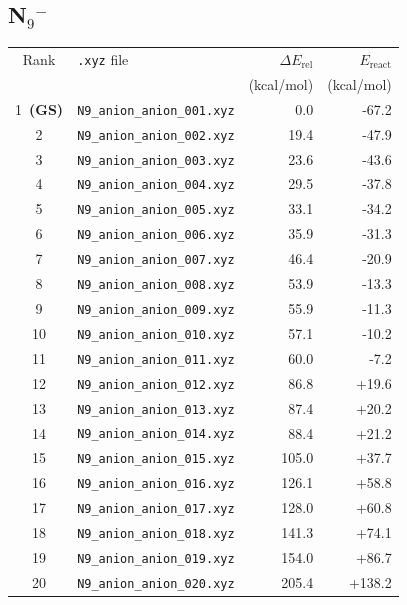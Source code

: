 \documentclass[11pt,a4paper]{article}
\begin{document}
\subsection*{N$_{9}$$^{-}$}
\begin{longtable}{clrr}
\toprule
Rank & \texttt{.xyz} file & $\Delta E_\text{rel}$ & $E_\text{react}$ \\
 & & (kcal/mol) & (kcal/mol) \\
\midrule\endhead
\rowcolor{gs}1~\textbf{(GS)} & \texttt{N9\_anion\_anion\_001.xyz} & 0.0 & -67.2 \\
2 & \texttt{N9\_anion\_anion\_002.xyz} & 19.4 & -47.9 \\
3 & \texttt{N9\_anion\_anion\_003.xyz} & 23.6 & -43.6 \\
4 & \texttt{N9\_anion\_anion\_004.xyz} & 29.5 & -37.8 \\
5 & \texttt{N9\_anion\_anion\_005.xyz} & 33.1 & -34.2 \\
6 & \texttt{N9\_anion\_anion\_006.xyz} & 35.9 & -31.3 \\
7 & \texttt{N9\_anion\_anion\_007.xyz} & 46.4 & -20.9 \\
8 & \texttt{N9\_anion\_anion\_008.xyz} & 53.9 & -13.3 \\
9 & \texttt{N9\_anion\_anion\_009.xyz} & 55.9 & -11.3 \\
10 & \texttt{N9\_anion\_anion\_010.xyz} & 57.1 & -10.2 \\
11 & \texttt{N9\_anion\_anion\_011.xyz} & 60.0 & -7.2 \\
12 & \texttt{N9\_anion\_anion\_012.xyz} & 86.8 & +19.6 \\
13 & \texttt{N9\_anion\_anion\_013.xyz} & 87.4 & +20.2 \\
14 & \texttt{N9\_anion\_anion\_014.xyz} & 88.4 & +21.2 \\
15 & \texttt{N9\_anion\_anion\_015.xyz} & 105.0 & +37.7 \\
16 & \texttt{N9\_anion\_anion\_016.xyz} & 126.1 & +58.8 \\
17 & \texttt{N9\_anion\_anion\_017.xyz} & 128.0 & +60.8 \\
18 & \texttt{N9\_anion\_anion\_018.xyz} & 141.3 & +74.1 \\
19 & \texttt{N9\_anion\_anion\_019.xyz} & 154.0 & +86.7 \\
20 & \texttt{N9\_anion\_anion\_020.xyz} & 205.4 & +138.2 \\
\bottomrule
\end{longtable}
\end{document}
